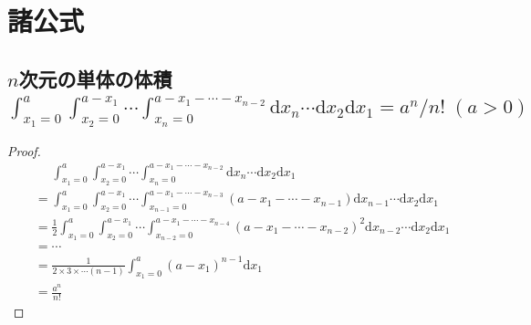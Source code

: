     \section{諸公式}
        \subsection{\texorpdfstring{$n$}{n}次元の単体の体積\texorpdfstring{$\int_{x_1=0}^a \int_{x_2=0}^{a-x_1} \dotsi \int_{x_n=0}^{a-x_1- \dotsb - x_{n-2}} \mathrm{d}x_n \dotsi \mathrm{d}x_2\mathrm{d}x_1 = a^n/n!\;(a>0)$}{}}
        \begin{proof}
            \begin{align*}
                &\phantom{=} \int_{x_1=0}^a \int_{x_2=0}^{a-x_1} \dotsi \int_{x_n=0}^{a-x_1- \dotsb - x_{n-2}} \mathrm{d}x_n \dotsi \mathrm{d}x_2\mathrm{d}x_1 \\
                &= \int_{x_1=0}^a \int_{x_2=0}^{a-x_1} \dotsi \int_{x_{n-1}=0}^{a-x_1- \dotsb - x_{n-3}} (a-x_1- \dotsb - x_{n-1}) \mathrm{d}x_{n-1} \dotsi \mathrm{d}x_2\mathrm{d}x_1 \\
                &= \frac{1}{2}\int_{x_1=0}^a \int_{x_2=0}^{a-x_1} \dotsi \int_{x_{n-2}=0}^{a-x_1-\dotsb-x_{n-4}} (a-x_1- \dotsb - x_{n-2})^2 \mathrm{d}x_{n-2} \dotsi \mathrm{d}x_2\mathrm{d}x_1 \\
                &= \dotsb \\
                &= \frac{1}{2\times 3\times\dotsb(n-1)}\int_{x_1=0}^a (a-x_1)^{n-1} \mathrm{d}x_1 \\
                &= \frac{a^n}{n!}
            \end{align*}
        \end{proof}